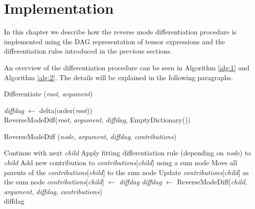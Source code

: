 \documentclass[12pt, a4paper]{report}
\begin{document}
\FloatBarrier
\section{Implementation}
In this chapter we describe how the reverse mode differentiation procedure is implemented using the DAG representation of tensor expressions and the differentiation rules introduced in the previous sections.

An overview of the differentiation procedure can be seen in Algorithm \ref{alg:1} and Algorithm \ref{alg:2}.
The details will be explained in the following paragraphs.

\begin{algorithm}
    \caption{Differentiate (\textit{root}, \textit{argument})}\label{alg:1}
    \begin{algorithmic}
        \State \textit{diffdag} $\gets$ delta(order(\textit{root}))  \\
        \Return ReverseModeDiff(\textit{root}, \textit{argument}, \textit{diffdag}, EmptyDictionary())
    \end{algorithmic}
\end{algorithm}

\begin{algorithm}
    \caption{ReverseModeDiff (\textit{node}, \textit{argument}, \textit{diffdag}, \textit{contributions})}\label{alg:2}
    \begin{algorithmic}
                \State Continue with next \textit{child}
            \EndIf
            \State Apply fitting differentiation rule (depending on \textit{node}) to \textit{child}
                \State Add new contribution to \textit{contributions}[\textit{child}] using a sum node
                \State Move all parents of the \textit{contributions}[\textit{child}] to the sum node
                \State Update \textit{contributions}[\textit{child}] as the sum node
            \Else
                \State \textit{contributions}[\textit{child}] $\gets$ \textit{diffdag}
                \State \textit{diffdag} $\gets$ ReverseModeDiff(\textit{child}, \textit{argument}, \textit{diffdag}, \textit{contributions})
            \EndIf
        \EndFor \\
        \Return diffdag
    \end{algorithmic}
\end{algorithm}
\end{document}
